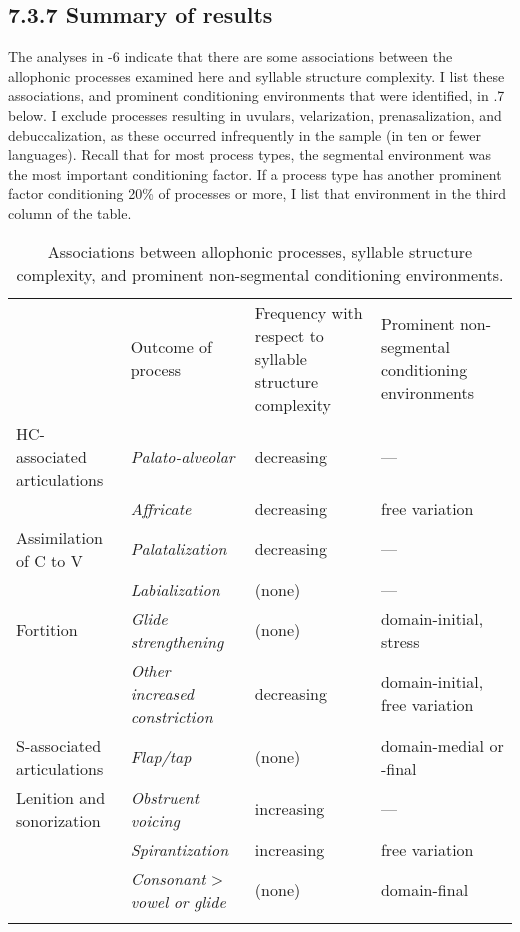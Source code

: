 \subsection{7.3.7 Summary of results} 

  The analyses in -6 indicate that there are some associations between the allophonic processes examined here and syllable structure complexity. I list these associations, and prominent conditioning environments that were identified, in .7 below. I exclude processes resulting in uvulars, velarization, prenasalization, and debuccalization, as these occurred infrequently in the sample (in ten or fewer languages). Recall that for most process types, the segmental environment was the most important conditioning factor. If a process type has another prominent factor conditioning 20\% of processes or more, I list that environment in the third column of the table.






\begin{table}
\begin{tabularx}{\textwidth}{XXXX}
\lsptoprule
 & Outcome of process & Frequency with respect to syllable structure complexity & Prominent non-segmental conditioning environments\\
HC-associated articulations & \textit{Palato-alveolar} & decreasing & —\\
\hhline{-~~~} & \textit{Affricate} & decreasing & free variation\\
Assimilation of C to V & \textit{Palatalization} & decreasing & —\\
\hhline{-~~~} & \textit{Labialization} & (none) & —\\
Fortition & \textit{Glide} \textit{strengthening} & (none) & domain-initial, stress\\
\hhline{-~~~} & \textit{Other} \textit{increased} \textit{constriction} & decreasing & domain-initial, free variation\\
S-associated articulations & \textit{Flap/tap} & (none) & domain-medial or -final\\
Lenition and sonorization & \textit{Obstruent} \textit{voicing} & increasing & —\\
\hhline{-~~~} & \textit{Spirantization} & increasing & free variation\\
& \textit{Consonant} > \textit{vowel} \textit{or} \textit{glide} & (none) & domain-final\\
\hhline{~---}
\lspbottomrule
\end{tabularx}
\caption{\label{7.7}Associations between allophonic processes, syllable structure complexity, and prominent non-segmental conditioning environments.}
\end{table}





